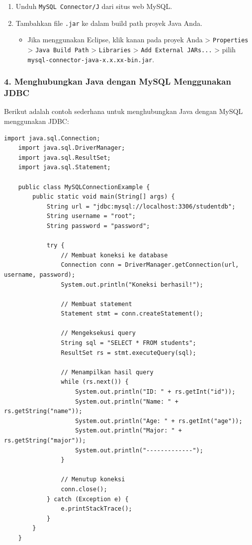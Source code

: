 \begin{enumerate}
	\item Unduh \texttt{MySQL Connector/J} dari situs web MySQL.
	\item Tambahkan file \texttt{.jar} ke dalam build path proyek Java Anda.
	\begin{itemize}
		\item Jika menggunakan Eclipse, klik kanan pada proyek Anda > \texttt{Properties} > \texttt{Java Build Path} > \texttt{Libraries} > \texttt{Add External JARs...} > pilih \texttt{mysql-connector-java-x.x.xx-bin.jar}.
	\end{itemize}
\end{enumerate}

\subsubsection{4. Menghubungkan Java dengan MySQL Menggunakan JDBC}

Berikut adalah contoh sederhana untuk menghubungkan Java dengan MySQL menggunakan JDBC:

\begin{lstlisting}[style=JavaStyle]
	import java.sql.Connection;
	import java.sql.DriverManager;
	import java.sql.ResultSet;
	import java.sql.Statement;
	
	public class MySQLConnectionExample {
		public static void main(String[] args) {
			String url = "jdbc:mysql://localhost:3306/studentdb";
			String username = "root";
			String password = "password";
			
			try {
				// Membuat koneksi ke database
				Connection conn = DriverManager.getConnection(url, username, password);
				System.out.println("Koneksi berhasil!");
				
				// Membuat statement
				Statement stmt = conn.createStatement();
				
				// Mengeksekusi query
				String sql = "SELECT * FROM students";
				ResultSet rs = stmt.executeQuery(sql);
				
				// Menampilkan hasil query
				while (rs.next()) {
					System.out.println("ID: " + rs.getInt("id"));
					System.out.println("Name: " + rs.getString("name"));
					System.out.println("Age: " + rs.getInt("age"));
					System.out.println("Major: " + rs.getString("major"));
					System.out.println("-------------");
				}
				
				// Menutup koneksi
				conn.close();
			} catch (Exception e) {
				e.printStackTrace();
			}
		}
	}
\end{lstlisting}

